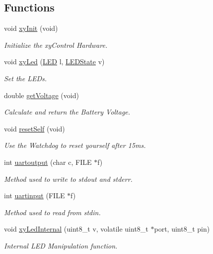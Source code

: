 \subsection*{Functions}
\begin{DoxyCompactItemize}
\item 
void \hyperlink{group__xycontrol_ga2b3fb0734a2675e6dbdcb2c7665a708f}{xy\-Init} (void)
\begin{DoxyCompactList}\small\item\em Initialize the xy\-Control Hardware. \end{DoxyCompactList}\item 
void \hyperlink{group__xycontrol_ga783aead7f97dd462a9af56b7fc3b228f}{xy\-Led} (\hyperlink{group__xycontrol_gaadcb6002d2b42fdfe01490f730ab00a6}{L\-E\-D} l, \hyperlink{group__xycontrol_ga51a69e0b98357e170e63bc843e2fd1c0}{L\-E\-D\-State} v)
\begin{DoxyCompactList}\small\item\em Set the L\-E\-Ds. \end{DoxyCompactList}\item 
double \hyperlink{group__xycontrol_ga97874cf2a7f8e6964188b54fe85084a6}{get\-Voltage} (void)
\begin{DoxyCompactList}\small\item\em Calculate and return the Battery Voltage. \end{DoxyCompactList}\item 
void \hyperlink{group__xycontrol_gab80f101c0a50bca30d796fad70cfd8d7}{reset\-Self} (void)
\begin{DoxyCompactList}\small\item\em Use the Watchdog to reset yourself after 15ms. \end{DoxyCompactList}\item 
int \hyperlink{group__xycontrol_ga7e2be90354ccc3af05947764858bc0b1}{uartoutput} (char c, F\-I\-L\-E $\ast$f)
\begin{DoxyCompactList}\small\item\em Method used to write to stdout and stderr. \end{DoxyCompactList}\item 
int \hyperlink{group__xycontrol_ga3f158de66529c4606b8d8a380e5a5b07}{uartinput} (F\-I\-L\-E $\ast$f)
\begin{DoxyCompactList}\small\item\em Method used to read from stdin. \end{DoxyCompactList}\item 
void \hyperlink{group__xycontrol_ga8b94cac17e75735eec6f6fa42d21ab72}{xy\-Led\-Internal} (uint8\-\_\-t v, volatile uint8\-\_\-t $\ast$port, uint8\-\_\-t pin)
\begin{DoxyCompactList}\small\item\em Internal L\-E\-D Manipulation function. \end{DoxyCompactList}\end{DoxyCompactItemize}
